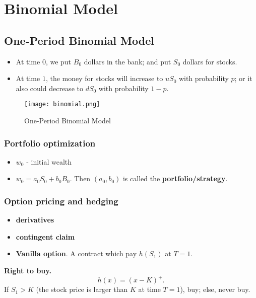 \section{Binomial Model}
\subsection{One-Period Binomial Model}
\begin{itemize}
	\item At time $0$, we put $B_0$ dollars in the bank; and put $S_0$ dollars for stocks.
	\item At time $1$, the money for stocks will increase to $uS_0$ with probability $p$; or it also could decrease to $dS_0$ with probability $1-p$.  
\end{itemize}
\begin{figure}[H]
	\centering
	\texttt{[image: binomial.png]}
	\caption{One-Period Binomial Model}
\end{figure}

\subsubsection*{Portfolio optimization}
\begin{mydef} \textbf{ }
	\begin{itemize}
		\item $w_0$ - initial wealth
		\item $w_0 = a_0 S_0 + b_0 B_0$. Then $(a_0, b_0)$ is called the \textbf{portfolio/strategy}.
	\end{itemize}
\end{mydef}


\subsubsection*{Option pricing and hedging}
\begin{mydef}\textbf{ }
	\begin{itemize}
		\item \textbf{derivatives}
		\item \textbf{contingent claim}
		\item \textbf{Vanilla option}. A contract which pay $h(S_1)$ at $T=1$.
	\end{itemize} 
\end{mydef}
 
\begin{exap}
	\textbf{Right to buy.}
	$$h(x) = (x - K)^+.$$
	If $S_1 > K$ (the stock price is larger than $K$ at time $T=1$), buy; else, never buy.
\end{exap}

